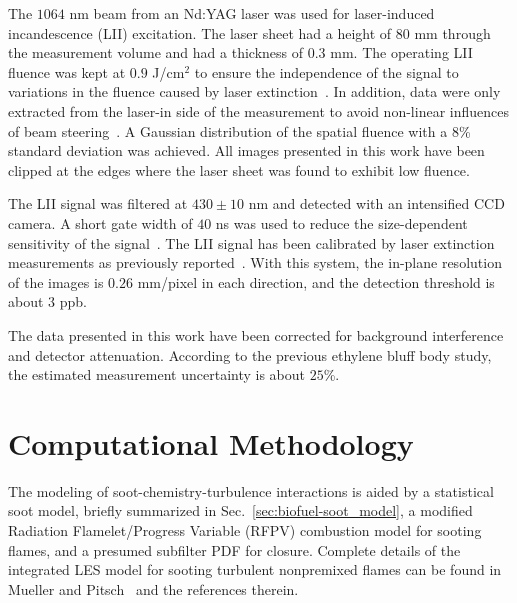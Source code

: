 The $1064$ nm beam from an Nd:YAG laser was used for laser-induced incandescence (LII) excitation.  The laser sheet had a height of $80$ mm through the measurement volume and had a thickness of $0.3$ mm.  The operating LII fluence was kept at $0.9$ J/cm$^2$ to ensure the independence of the signal to variations in the fluence caused by laser extinction~\cite{qamar09,schulz06}.  In addition, data were only extracted from the laser-in side of the measurement to avoid non-linear influences of beam steering~\cite{sun15}.  A Gaussian distribution of the spatial fluence with a $8$\% standard deviation was achieved.  All images presented in this work have been clipped at the edges where the laser sheet was found to exhibit low fluence.  

The LII signal was filtered at $430 \pm 10$ nm and detected with an intensified CCD camera.  A short gate width of $40$ ns was used to reduce the size-dependent sensitivity of the signal~\cite{bladh08}.  The LII signal has been calibrated by laser extinction measurements as previously reported~\cite{mueller13}.  With this system, the in-plane resolution of the images is $0.26$ mm/pixel in each direction, and the detection threshold is about $3$ ppb.

The data presented in this work have been corrected for background interference and detector attenuation.  According to the previous ethylene bluff body study, the estimated measurement uncertainty is about $25$\%.  

\section{Computational Methodology}

The modeling of soot-chemistry-turbulence interactions is aided by a statistical soot model, briefly summarized in Sec.~\ref{sec:biofuel-soot_model}, a modified Radiation Flamelet/Progress Variable (RFPV) combustion model for sooting flames, and a presumed subfilter PDF for closure.  Complete details of the integrated LES model for sooting turbulent nonpremixed flames can be found in Mueller and Pitsch~\cite{mueller12} and the references therein.

